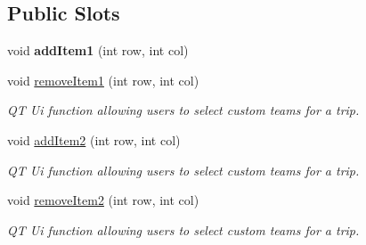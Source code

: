 \subsection*{Public Slots}
\begin{DoxyCompactItemize}
\item 
\mbox{\label{class_trip_window_aabdb6746515d78bd347b71d90e144dc2}} 
void {\bfseries add\+Item1} (int row, int col)
\item 
\mbox{\label{class_trip_window_a32737b6f063a65fa49b1c584da85d3cf}} 
void \mbox{\hyperlink{class_trip_window_a32737b6f063a65fa49b1c584da85d3cf}{remove\+Item1}} (int row, int col)
\begin{DoxyCompactList}\small\item\em QT Ui function allowing users to select custom teams for a trip. \end{DoxyCompactList}\item 
\mbox{\label{class_trip_window_aabba0a16f98658f4a5d4582fba74cb6d}} 
void \mbox{\hyperlink{class_trip_window_aabba0a16f98658f4a5d4582fba74cb6d}{add\+Item2}} (int row, int col)
\begin{DoxyCompactList}\small\item\em QT Ui function allowing users to select custom teams for a trip. \end{DoxyCompactList}\item 
\mbox{\label{class_trip_window_abdc696c4355e726d204a88eb06bdc0b6}} 
void \mbox{\hyperlink{class_trip_window_abdc696c4355e726d204a88eb06bdc0b6}{remove\+Item2}} (int row, int col)
\begin{DoxyCompactList}\small\item\em QT Ui function allowing users to select custom teams for a trip. \end{DoxyCompactList}\end{DoxyCompactItemize}

